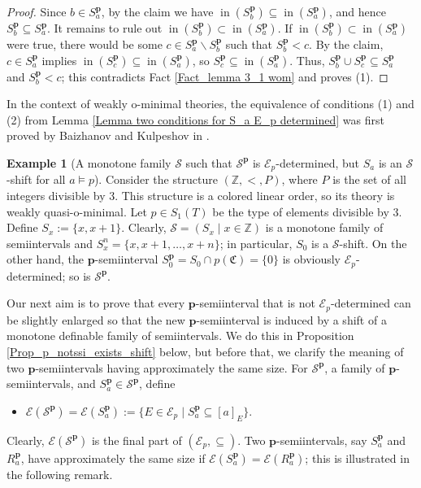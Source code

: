 \documentclass{amsart}
\theoremstyle{definition}
\theoremstyle{definition}
\newtheorem{Example}[Theorem]{Example}
\newcommand{\Mon}{\mathfrak C}
\def\pp{\mathbf{p}}
\DeclareMathOperator{\supin}{in}
\begin{document}
\begin{proof}
Since $b\in S^{\mathbf p}_a$, by the claim we have $\supin (S^{\mathbf p}_b)\subseteq  \supin (S^{\mathbf p}_a)$, and hence $S^{\mathbf p}_b\subseteq S^{\mathbf p}_a$. 
It remains to rule out $\supin (S^{\mathbf p}_b)\subset\supin (S^{\mathbf p}_a)$. 
If $\supin (S^{\mathbf p}_b)\subset\supin (S^{\mathbf p}_a)$ were true, there would be some $c\in S^{\mathbf p}_a\smallsetminus S^{\mathbf p}_b$ such that $S^{\mathbf p}_b<c$. By the claim, $c\in S^{\mathbf p}_a$ implies $\supin (S^{\mathbf p}_c)\subseteq \supin (S^{\mathbf p}_a)$, so $S^{\mathbf p}_c\subseteq \supin (S^{\mathbf p}_a)$.
Thus, $S^{\mathbf p}_b\cup S^{\mathbf p}_c\subseteq S^{\mathbf p}_a$ and $S^{\mathbf p}_b<c$; this contradicts Fact \ref{Fact_lemma 3_1 wom} and proves (1).  
\end{proof}
In the context of weakly o-minimal theories, the equivalence of conditions (1) and (2) from Lemma \ref{Lemma two conditions for S_a E_p determined} was first proved by Baizhanov and Kulpeshov in \cite{Baizhanov2006}. 
 

\begin{Example}[A monotone family $\mathcal S$ such that $\mathcal S^\pp$ is $\mathcal E_p$-determined, but $S_a$ is an $\mathcal S$-shift for all $a\models p$]
Consider the structure $(\mathbb Z, <,P)$, where $P$ is the set of all integers divisible by 3. This structure is a colored linear order, so its theory is weakly quasi-o-minimal. Let $p\in S_1(T)$ be the type of elements divisible by 3. Define $S_x:=\{x,x+1\}$. Clearly, $\mathcal S= (S_x\mid x\in\mathbb Z)$ is a monotone family of semiintervals and $S_x^n=\{x,x+1,\ldots,x+n\}$; in particular, $S_0$ is a $\mathcal S$-shift. On the other hand, the $\mathbf p$-semiinterval $S_0^{\mathbf p}=S_0\cap p(\Mon)=\{0\}$ is obviously $\mathcal E_p$-determined; so is $\mathcal S^\pp$.  
\end{Example}


Our next aim is to prove that every $\mathbf p$-semiinterval that is not $\mathcal E_p$-determined can be slightly enlarged so that the new $\mathbf p$-semiinterval is induced by a shift of a monotone definable family of semiintervals. We do this in Proposition \ref{Prop_p_notssi_exists_shift} below, but before that, we clarify the meaning of two $\mathbf p$-semiintervals having approximately the same size.
For $\mathcal S^\mathbf p$, a family of $\mathbf p$-semiintervals, and $S^{\mathbf p}_a\in \mathcal S^{\mathbf p}$, define
\begin{itemize}
    \item $\mathcal E(\mathcal S^{\mathbf p})=\mathcal E(S^{\mathbf p}_a):=\{E\in\mathcal E_p\mid S^{\mathbf p}_a\subseteq [a]_E\}$.
\end{itemize}
Clearly, $\mathcal E(\mathcal S^{\mathbf p})$ is the final part of $(\mathcal E_p,\subseteq)$. Two $\mathbf p$-semiintervals, say $S_a^{\mathbf p}$ and $R_a^{\mathbf p}$, have approximately the same size if $\mathcal E(S_a^{\mathbf p})=\mathcal E(R_a^{\mathbf p})$; this is illustrated in the following remark.  
\end{document}
